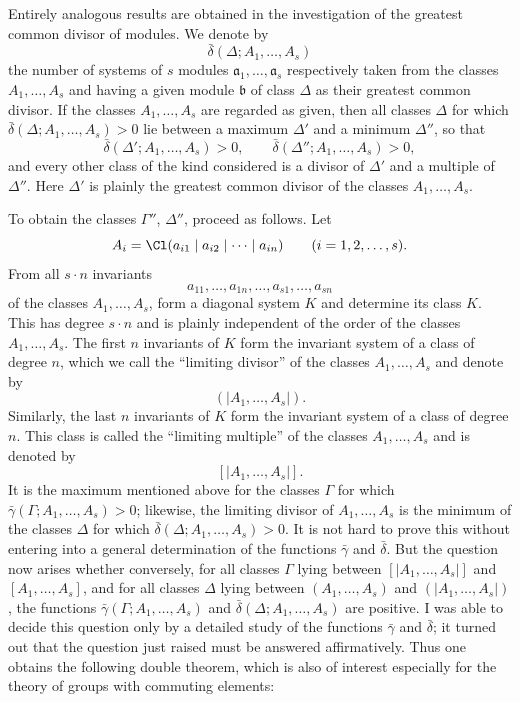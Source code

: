 Entirely analogous results are obtained in the investigation of the greatest common divisor of modules. We denote by
\[
 \bar\delta(\Delta;A_1,\ldots,A_s)
\]
the number of systems of $s$ modules $\mathfrak a_1,\ldots,\mathfrak a_s$ respectively taken from the classes $A_1,\ldots,A_s$ and having a given module $\mathfrak b$ of class $\Delta$ as their greatest common divisor. If the classes $A_1,\ldots,A_s$ are regarded as given, then all classes $\Delta$ for which $\bar\delta(\Delta;A_1,\ldots,A_s)>0$ lie between a maximum $\Delta'$ and a minimum $\Delta''$, so that
\[
 \bar\delta(\Delta';A_1,\ldots,A_s)>0,
 \qquad
 \bar\delta(\Delta'';A_1,\ldots,A_s)>0,
\]
and every other class of the kind considered is a divisor of $\Delta'$ and a multiple of $\Delta''$. Here $\Delta'$ is plainly the greatest common divisor of the classes $A_1,\ldots,A_s$.

To obtain the classes $\Gamma''$, $\Delta''$, proceed as follows. Let
\[
 A_i=\Cl(a_{i1}\mid a_{i2}\mid\cdots\mid a_{in})\qquad (i=1,2,\ldots,s).
\]
From all $s\cdot n$ invariants
\[
 a_{11},\ldots,a_{1n},\ldots,a_{s1},\ldots,a_{sn}
\]
of the classes $A_1,\ldots,A_s$, form a diagonal system $K$ and determine its class $K$. This has degree $s\cdot n$ and is plainly independent of the order of the classes $A_1,\ldots,A_s$. The first $n$ invariants of $K$ form the invariant system of a class of degree $n$, which we call the ``limiting divisor'' of the classes $A_1,\ldots,A_s$ and denote by
\[
 (\!|A_1,\ldots,A_s|\!).
\]
Similarly, the last $n$ invariants of $K$ form the invariant system of a class of degree $n$. This class is called the ``limiting multiple'' of the classes $A_1,\ldots,A_s$ and is denoted by
\[
 [\!|A_1,\ldots,A_s|\!].
\]
It is the maximum mentioned above for the classes $\Gamma$ for which $\bar\gamma(\Gamma;A_1,\ldots,A_s)>0$; likewise, the limiting divisor of $A_1,\ldots,A_s$ is the minimum of the classes $\Delta$ for which $\bar\delta(\Delta;A_1,\ldots,A_s)>0$. It is not hard to prove this without entering into a general determination of the functions $\bar\gamma$ and $\bar\delta$. But the question now arises whether conversely, for all classes $\Gamma$ lying between $[\!|A_1,\ldots,A_s|\!]$ and $[A_1,\ldots,A_s]$, and for all classes $\Delta$ lying between $(A_1,\ldots,A_s)$ and $(\!|A_1,\ldots,A_s|\!)$, the functions $\bar\gamma(\Gamma;A_1,\ldots,A_s)$ and $\bar\delta(\Delta;A_1,\ldots,A_s)$ are positive. I was able to decide this question only by a detailed study of the functions $\bar\gamma$ and $\bar\delta$; it turned out that the question just raised must be answered affirmatively. Thus one obtains the following double theorem, which is also of interest especially for the theory of groups with commuting elements:

